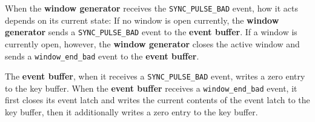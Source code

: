 \begin{itemize}
When the \textbf{window generator} receives the \texttt{SYNC\_PULSE\_BAD} event, how it acts depends on its current state: If no window is open currently, the \textbf{window generator} sends a \texttt{SYNC\_PULSE\_BAD} event to the \textbf{event buffer}. If a window is currently open, however, the \textbf{window generator} closes the active window and sends a \texttt{window\_end\_bad} event to the \textbf{event buffer}.

The \textbf{event buffer}, when it receives a \texttt{SYNC\_PULSE\_BAD} event, writes a zero entry to the key buffer. When the \textbf{event buffer} receives a \texttt{window\_end\_bad} event, it first closes its event latch and writes the current contents of the event latch to the key buffer, then it additionally writes a zero entry to the key buffer.

\end{itemize}
